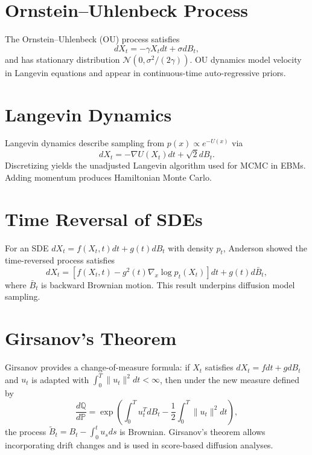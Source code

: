 \documentclass[11pt]{book}
\begin{document}
\section{Ornstein--Uhlenbeck Process}
The Ornstein--Uhlenbeck (OU) process satisfies
\begin{equation}
dX_t = -\gamma X_t dt + \sigma dB_t,
\end{equation}
and has stationary distribution $\mathcal{N}(0, \sigma^2/(2\gamma))$. OU dynamics model velocity in Langevin equations and appear in continuous-time auto-regressive priors.

\section{Langevin Dynamics}
Langevin dynamics describe sampling from $p(x)\propto e^{-U(x)}$ via
\begin{equation}
dX_t = -\nabla U(X_t) dt + \sqrt{2} dB_t.
\end{equation}
Discretizing yields the unadjusted Langevin algorithm used for MCMC in EBMs. Adding momentum produces Hamiltonian Monte Carlo.

\section{Time Reversal of SDEs}
For an SDE $dX_t=f(X_t,t)dt+g(t)dB_t$ with density $p_t$, Anderson \cite{anderson1982} showed the time-reversed process satisfies
\begin{equation}
dX_t = \left[f(X_t,t)-g^2(t)\nabla_x \log p_t(X_t)\right]dt + g(t) d\bar{B}_t,
\end{equation}
where $\bar{B}_t$ is backward Brownian motion. This result underpins diffusion model sampling.

\section{Girsanov's Theorem}
Girsanov \cite{girsanov1960} provides a change-of-measure formula: if $X_t$ satisfies $dX_t = f dt + g dB_t$ and $u_t$ is adapted with $\int_0^T \|u_t\|^2 dt < \infty$, then under the new measure defined by
\begin{equation}
\frac{d\mathbb{Q}}{d\mathbb{P}} = \exp\left(\int_0^T u_t^T dB_t - \frac12\int_0^T \|u_t\|^2 dt\right),
\end{equation}
the process $\tilde{B}_t = B_t - \int_0^t u_s ds$ is Brownian. Girsanov's theorem allows incorporating drift changes and is used in score-based diffusion analyses.
\end{document}
